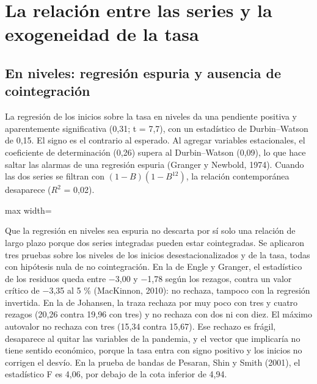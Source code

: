 \documentclass[11pt,a4paper]{article}
\newcommand{\tabla}[3]{\begin{table}[htbp]\centering\small\caption{#2}\label{#3}\begin{adjustbox}{max width=\linewidth}\end{adjustbox}\end{table}}
\begin{document}
\section{La relación entre las series y la exogeneidad de la tasa}

\subsection{En niveles: regresión espuria y ausencia de cointegración}

La regresión de los inicios sobre la tasa en niveles da una pendiente positiva y aparentemente significativa (0,31; t = 7,7), con un estadístico de Durbin--Watson de 0,15. El signo es el contrario al esperado. Al agregar variables estacionales, el coeficiente de determinación (0,26) supera al Durbin--Watson (0,09), lo que hace saltar las alarmas de una regresión espuria (Granger y Newbold, 1974). Cuando las dos series se filtran con $(1-B)(1-B^{12})$, la relación contemporánea desaparece ($R^2$ = 0,02).

\tabla{07_alarma.tex}{Regresiones en niveles y filtradas.}{tab:alarma}


Que la regresión en niveles sea espuria no descarta por sí solo una relación de largo plazo porque dos series integradas pueden estar cointegradas. Se aplicaron tres pruebas sobre los niveles de los inicios desestacionalizados y de la tasa, todas con hipótesis nula de no cointegración. En la de Engle y Granger, el estadístico de los residuos queda entre $-$3,00 y $-$1,78 según los rezagos, contra un valor crítico de $-$3,35 al 5 \% (MacKinnon, 2010): no rechaza, tampoco con la regresión invertida. En la de Johansen, la traza rechaza por muy poco con tres y cuatro rezagos (20,26 contra 19,96 con tres) y no rechaza con dos ni con diez. El máximo autovalor no rechaza con tres (15,34 contra 15,67). Ese rechazo es frágil, desaparece al quitar las variables de la pandemia, y el vector que implicaría no tiene sentido económico, porque la tasa entra con signo positivo y los inicios no corrigen el desvío. En la prueba de bandas de Pesaran, Shin y Smith (2001), el estadístico F es 4,06, por debajo de la cota inferior de 4,94.
\end{document}
